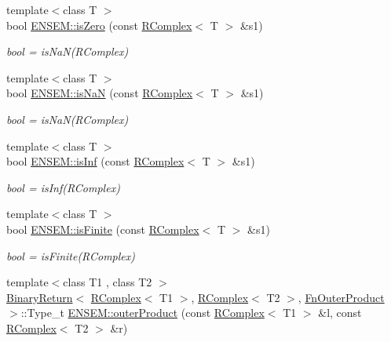 \begin{DoxyCompactItemize}
\item 
{\footnotesize template$<$class T $>$ }\\bool \mbox{\hyperlink{group__rcomplex_ga21235851ad3c6bba4973c55332baaa9e}{E\+N\+S\+E\+M\+::is\+Zero}} (const \mbox{\hyperlink{classENSEM_1_1RComplex}{R\+Complex}}$<$ T $>$ \&s1)
\begin{DoxyCompactList}\small\item\em bool = is\+Na\+N(\+R\+Complex) \end{DoxyCompactList}\item 
{\footnotesize template$<$class T $>$ }\\bool \mbox{\hyperlink{group__rcomplex_ga909986b087edfa0819ffe4b76d00ed42}{E\+N\+S\+E\+M\+::is\+NaN}} (const \mbox{\hyperlink{classENSEM_1_1RComplex}{R\+Complex}}$<$ T $>$ \&s1)
\begin{DoxyCompactList}\small\item\em bool = is\+Na\+N(\+R\+Complex) \end{DoxyCompactList}\item 
{\footnotesize template$<$class T $>$ }\\bool \mbox{\hyperlink{group__rcomplex_gabf9e4d305784028c682bdf06201dba86}{E\+N\+S\+E\+M\+::is\+Inf}} (const \mbox{\hyperlink{classENSEM_1_1RComplex}{R\+Complex}}$<$ T $>$ \&s1)
\begin{DoxyCompactList}\small\item\em bool = is\+Inf(\+R\+Complex) \end{DoxyCompactList}\item 
{\footnotesize template$<$class T $>$ }\\bool \mbox{\hyperlink{group__rcomplex_ga3152e73aedd89eafdfab17e0cb0363b5}{E\+N\+S\+E\+M\+::is\+Finite}} (const \mbox{\hyperlink{classENSEM_1_1RComplex}{R\+Complex}}$<$ T $>$ \&s1)
\begin{DoxyCompactList}\small\item\em bool = is\+Finite(\+R\+Complex) \end{DoxyCompactList}\item 
{\footnotesize template$<$class T1 , class T2 $>$ }\\\mbox{\hyperlink{structENSEM_1_1BinaryReturn}{Binary\+Return}}$<$ \mbox{\hyperlink{classENSEM_1_1RComplex}{R\+Complex}}$<$ T1 $>$, \mbox{\hyperlink{classENSEM_1_1RComplex}{R\+Complex}}$<$ T2 $>$, \mbox{\hyperlink{structENSEM_1_1FnOuterProduct}{Fn\+Outer\+Product}} $>$\+::Type\+\_\+t \mbox{\hyperlink{group__rcomplex_gaf9789ce4e93ec3781ea59cb4f44afe38}{E\+N\+S\+E\+M\+::outer\+Product}} (const \mbox{\hyperlink{classENSEM_1_1RComplex}{R\+Complex}}$<$ T1 $>$ \&l, const \mbox{\hyperlink{classENSEM_1_1RComplex}{R\+Complex}}$<$ T2 $>$ \&r)

\end{DoxyCompactItemize}

